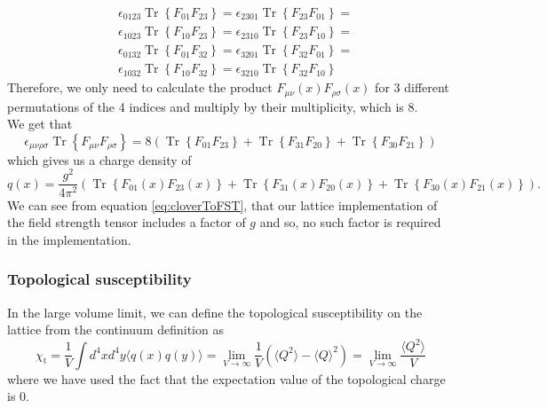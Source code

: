 \documentclass[a4paper,10pt]{article}
\begin{document}
\begin{equation*}
\begin{aligned} 
&\epsilon_{0123}\operatorname{Tr}\left\{F_{0 1} F_{2 3}\right\} = \epsilon_{2301}\operatorname{Tr}\left\{F_{2 3} F_{0 1}\right\}=\\
&\epsilon_{1023}\operatorname{Tr}\left\{F_{10} F_{2 3}\right\} = \epsilon_{2310}\operatorname{Tr}\left\{F_{23} F_{10}\right\} =\\
&\epsilon_{0132}\operatorname{Tr}\left\{F_{01} F_{32}\right\} = \epsilon_{3201}\operatorname{Tr}\left\{F_{32} F_{01}\right\} =\\
&\epsilon_{1032}\operatorname{Tr}\left\{F_{10} F_{32}\right\} = \epsilon_{3210}\operatorname{Tr}\left\{F_{32} F_{10}\right\}
\end{aligned}
\end{equation*}
Therefore, we only need to calculate the product $F_{\mu \nu}(x) F_{\rho \sigma}(x)$ for 3 different permutations of the 4 indices and multiply by their multiplicity, which is 8.\\
We get that
\begin{equation}
\epsilon_{\mu \nu \rho \sigma} \operatorname{Tr}\left\{F_{\mu \nu} F_{\rho \sigma}\right\} = 8\left( \operatorname{Tr}\left\{F_{01} F_{23}\right\} + \operatorname{Tr}\left\{F_{31} F_{20}\right\}+ \operatorname{Tr}\left\{F_{30} F_{21}\right\} \right)
\end{equation}
which gives us a charge density of 
\begin{equation}
q(x)=\frac{g^{2}}{4 \pi^{2}} \left( \operatorname{Tr}\left\{F_{01}(x) F_{23}(x)\right\} + \operatorname{Tr}\left\{F_{31}(x) F_{20}(x)\right\}+ \operatorname{Tr}\left\{F_{30}(x) F_{21}(x)\right\} \right).
\end{equation}
We can see from equation \eqref{eq:cloverToFST}, that our lattice implementation of the field strength tensor includes a factor of $g$ and so, no such factor is required in the implementation.

\subsubsection{Topological susceptibility}
In the large volume limit, we can define the topological susceptibility on the lattice from the continuum definition as 
\begin{equation}
\chi_{\mathrm{t}}=\frac{1}{V} \int d^{4} x d^{4} y\langle q(x) q(y)\rangle = \lim\limits_{V\rightarrow \infty}\frac{1}{V}\left( \langle Q^2 \rangle - \langle Q\rangle^2 \right) =\lim\limits_{V\rightarrow \infty} \frac{\langle Q^2 \rangle}{V}
\end{equation}
where we have used the fact that the expectation value of the topological charge is 0.
\end{document}
